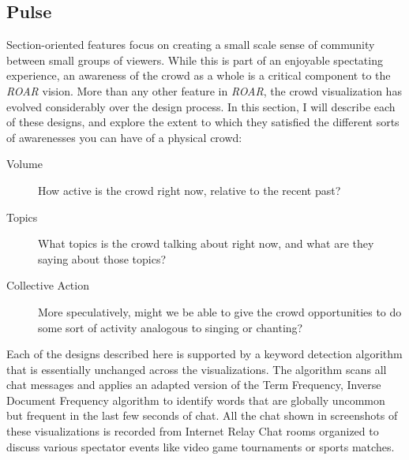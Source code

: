 \subsection{Pulse}

Section-oriented features focus on creating a small scale sense of community between small groups of viewers. While this is part of an enjoyable spectating experience, an awareness of the crowd as a whole is a critical component to the \emph{ROAR} vision. More than any other feature in \emph{ROAR}, the crowd visualization has evolved considerably over the design process. In this section, I will describe each of these designs, and explore the extent to which they satisfied the different sorts of awarenesses you can have of a physical crowd:

\begin{description}
\item [Volume]{How active is the crowd right now, relative to the recent past?}
\item [Topics]{What topics is the crowd talking about right now, and what are they saying about those topics?}
\item [Collective Action]{More speculatively, might we be able to give the crowd opportunities to do some sort of activity analogous to singing or chanting?}
\end{description}

Each of the designs described here is supported by a keyword detection algorithm that is essentially unchanged across the visualizations. The algorithm scans all chat messages and applies an adapted version of the Term Frequency, Inverse Document Frequency algorithm to identify words that are globally uncommon but frequent in the last few seconds of chat.  All the chat shown in screenshots of these visualizations is recorded from Internet Relay Chat rooms organized to discuss various spectator events like video game tournaments or sports matches. 

